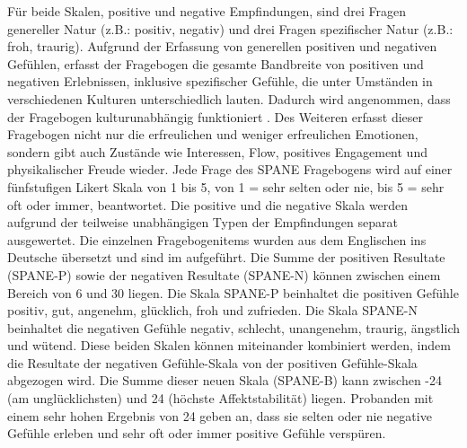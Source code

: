 Für beide Skalen, positive und negative Empfindungen, sind drei Fragen genereller Natur (z.B.: positiv, negativ) und drei Fragen spezifischer Natur (z.B.: froh, traurig). Aufgrund der Erfassung von generellen positiven und negativen Gefühlen, erfasst der Fragebogen die gesamte Bandbreite von positiven und negativen Erlebnissen, inklusive spezifischer Gefühle, die unter Umständen in verschiedenen Kulturen unterschiedlich lauten. Dadurch wird angenommen, dass der Fragebogen kulturunabhängig funktioniert \cite{Silva2013}. Des Weiteren erfasst dieser Fragebogen nicht nur die erfreulichen und weniger erfreulichen Emotionen, sondern gibt auch Zustände wie Interessen, Flow, positives Engagement und physikalischer Freude wieder.
Jede Frage des SPANE Fragebogens wird auf einer fünfstufigen Likert Skala von 1 bis 5, von 1 = sehr selten oder nie, bis 5 = sehr oft oder immer, beantwortet. Die positive und die negative Skala werden aufgrund der teilweise unabhängigen Typen der Empfindungen separat ausgewertet. Die einzelnen Fragebogenitems wurden aus dem Englischen ins Deutsche übersetzt und sind im  aufgeführt. Die Summe der positiven Resultate (SPANE-P) sowie der negativen Resultate (SPANE-N) können zwischen einem Bereich von 6 und 30 liegen. Die Skala SPANE-P beinhaltet die positiven Gefühle positiv, gut, angenehm, glücklich, froh und zufrieden. Die Skala SPANE-N beinhaltet die negativen Gefühle negativ, schlecht, unangenehm, traurig, ängstlich und wütend. Diese beiden Skalen können miteinander kombiniert werden, indem die Resultate der negativen Gefühle-Skala von der positiven Gefühle-Skala abgezogen wird. Die Summe dieser neuen Skala (SPANE-B) kann zwischen -24 (am unglücklichsten) und 24 (höchste Affektstabilität) liegen. Probanden mit einem sehr hohen Ergebnis von 24 geben an, dass sie selten oder nie negative Gefühle erleben und sehr oft oder immer positive Gefühle verspüren.


